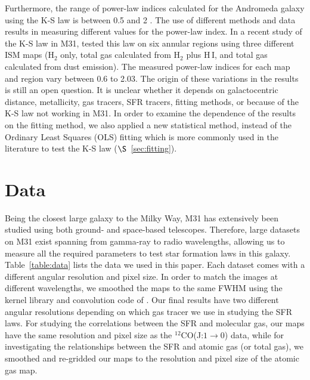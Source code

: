 Furthermore, the range of power-law indices calculated for the Andromeda galaxy using the K-S law is between 0.5 and 2 \citep[e.g.][]{Tabatabaei10,Ford13}. The use of different methods and data results in measuring different values for the power-law index. In a recent study of the K-S law in M31, \citet{Ford13} tested this law on six annular regions using three different ISM maps (H$_2$ only, total gas calculated from H$_2$ plus H\,{\sc I}, and total gas calculated from dust emission). The measured power-law indices for each map and region vary between 0.6 to 2.03. The origin of these variations in the results is still an open question. It is unclear whether it depends on galactocentric distance, metallicity, gas tracers, SFR tracers, fitting methods, or because of the K-S law not working in M31. In order to examine the dependence of the results on the fitting method, we also applied a new statistical method, instead of the Ordinary Least Squares (OLS) fitting which is more commonly used in the literature to test the K-S law ($\S$~\ref{sec:fitting}). 




\section{Data}
\label{sec: data_sfl}
Being the closest large galaxy to the Milky Way, M31 has extensively been studied using both ground- and space-based telescopes. Therefore, large datasets on M31 exist spanning from gamma-ray to radio wavelengths, allowing us to measure all the required parameters to test star formation laws in this galaxy. Table~\ref{table:data} lists the data we used in this paper. Each dataset comes with a different angular resolution and pixel size. In order to match the images at different wavelengths, we smoothed the maps to the same FWHM using the kernel library and convolution code of \citet{Aniano11}. Our final results have two different angular resolutions depending on which gas tracer we use in studying the SFR laws. For studying the correlations between the SFR and molecular gas, our maps have the same resolution and pixel size as the $^{12}$CO(J:$1\rightarrow0$) data, while for investigating the relationships between the SFR and atomic gas (or total gas), we smoothed and re-gridded our maps to the resolution and pixel size of the atomic gas map.


